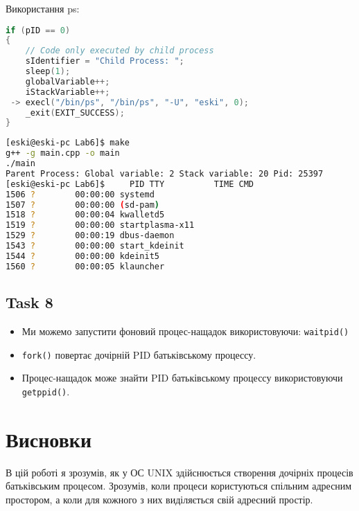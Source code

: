 \documentclass{article}
\begin{document}
Використання ps:

\begin{lstlisting}[language=C]
if (pID == 0)
{
	// Code only executed by child process
	sIdentifier = "Child Process: ";
	sleep(1);
	globalVariable++;
	iStackVariable++;
 -> execl("/bin/ps", "/bin/ps", "-U", "eski", 0);
	_exit(EXIT_SUCCESS);
}
\end{lstlisting}

\begin{lstlisting}[language=BASH]
[eski@eski-pc Lab6]$ make
g++ -g main.cpp -o main
./main
Parent Process: Global variable: 2 Stack variable: 20 Pid: 25397
[eski@eski-pc Lab6]$     PID TTY          TIME CMD
1506 ?        00:00:00 systemd
1507 ?        00:00:00 (sd-pam)
1518 ?        00:00:04 kwalletd5
1519 ?        00:00:00 startplasma-x11
1529 ?        00:00:19 dbus-daemon
1543 ?        00:00:00 start_kdeinit
1544 ?        00:00:00 kdeinit5
1560 ?        00:00:05 klauncher
\end{lstlisting}

\subsection*{Task 8}
\begin{itemize}
	\item Ми можемо запустити фоновий процес-нащадок
	використовуючи: \texttt{waitpid()}
	
	\item \texttt{fork()} повертає дочірній PID батьківському процессу.
	
	\item Процес-нащадок може знайти PID батьківському процессу
	використовуючи \texttt{getppid()}.
	
\end{itemize}
\newpage
\section*{Висновки}
В цій роботі я зрозумів, як у ОС UNIX здійснюється створення дочірніх процесів батьківським процесом. Зрозумів, коли процеси користуються спільним адресним простором, а коли для кожного з них виділяється свій адресний простір.
\end{document}
